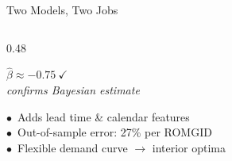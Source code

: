\documentclass[aspectratio=169]{beamer}
\begin{document}
\begin{frame}{Two Models, Two Jobs}
\begin{columns}[T,onlytextwidth]
\begin{column}{0.48\textwidth}
\begin{tcolorbox}[
  colback=cardgreen, colframe=greenborder,
  arc=3pt, boxrule=0.6pt,
  left=10pt, right=10pt, top=10pt, bottom=10pt
]
  \begin{tcolorbox}[
    colback=white, colframe=greenborder,
    arc=2pt, boxrule=0.5pt,
    left=4pt, right=4pt, top=4pt, bottom=4pt
  ]
    \centering
    {\bfseries\color{darkgreen} $\hat\beta \approx -0.75\ \checkmark$}\\[-1pt]
    {\tiny\itshape\color{lightgray} confirms Bayesian estimate}
  \end{tcolorbox}
  \vspace{8pt}

  {\footnotesize\color{darktext}
   $\bullet$\ Adds lead time \& calendar features\\[4pt]
   $\bullet$\ Out-of-sample error: 27\% per ROMGID\\[4pt]
   $\bullet$\ Flexible demand curve $\to$ interior optima}
\end{tcolorbox}
\end{column}

\end{columns}
\end{frame}
\end{document}
